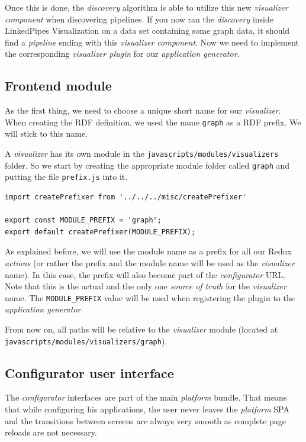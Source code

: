 Once this is done, the \emph{discovery} algorithm is able to utilize this new \emph{visualizer component} when discovering pipelines. If you now ran the \emph{discovery} inside LinkedPipes Visualization on a data set containing some graph data, it should find a \emph{pipeline} ending with this \emph{visualizer component}. Now we need to implement the corresponding \emph{visualizer plugin} for our \emph{application generator}.

\subsection{Frontend module}
\label{sec:implementation:integrating-visualizer:2}

As the first thing, we need to choose a unique short name for our \emph{visualizer}. When creating the RDF definition, we used the name \texttt{graph} as a RDF prefix. We will stick to this name.

A \emph{visualizer} has its own module in the \texttt{javascripts/modules/visualizers} folder. So we start by creating the appropriate module folder called \texttt{graph} and putting the file \texttt{prefix.js} into it.

\begin{verbatim}
import createPrefixer from '../../../misc/createPrefixer'

export const MODULE_PREFIX = 'graph';
export default createPrefixer(MODULE_PREFIX);
\end{verbatim}

As explained before, we will use the module name as a prefix for all our Redux \emph{actions} (or rather the prefix and the module name will be used as the \emph{visualizer} name). In this case, the prefix will also become part of the \emph{configurator} URL. Note that this is the actual and the only one \emph{source of truth} for the \emph{visualizer} name. The \texttt{MODULE\_PREFIX} value will be used when registering the plugin to the \emph{application generator}.

From now on, all paths will be relative to the \emph{visualizer} module (located at \texttt{javascripts/modules/visualizers/graph}).

\subsection{Configurator user interface}
\label{sec:implementation:integrating-visualizer:configurator}

The \emph{configurator} interfaces are part of the main \emph{platform} bundle. That means that while configuring his applications, the user never leaves the \emph{platform} SPA and the transitions between screens are always very smooth as complete page reloads are not necessary.

